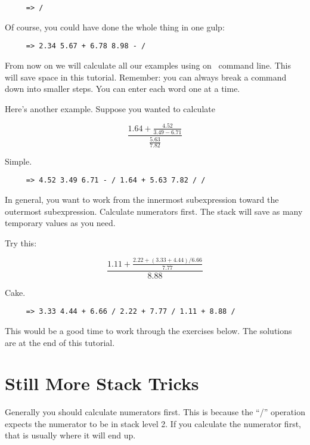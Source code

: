 \documentclass{report}
\begin{document}
\begin{verbatim}
     => /
\end{verbatim}

Of course, you could have done the whole thing in one gulp:

\begin{verbatim}
     => 2.34 5.67 + 6.78 8.98 - /
\end{verbatim}

From now on we will calculate all our examples using on \CLAC\ command line. This will save
space in this tutorial. Remember: you can always break a command down into smaller steps. You
can enter each word one at a time.

Here's another example. Suppose you wanted to calculate

\begin{displaymath}
     \frac { 1.64 + \frac {4.52}{3.49 - 6.71} }{ \frac {5.63}{7.82} }
\end{displaymath}

Simple.

\begin{verbatim}
     => 4.52 3.49 6.71 - / 1.64 + 5.63 7.82 / /
\end{verbatim}

In general, you want to work from the innermost subexpression toward the outermost
subexpression. Calculate numerators first. The stack will save as many temporary values as you
need.

Try this:

\begin{displaymath}
     \frac{1.11 + \frac{2.22 + (3.33 + 4.44)/6.66 }{7.77} }{8.88}
\end{displaymath}

Cake.

\begin{verbatim}
     => 3.33 4.44 + 6.66 / 2.22 + 7.77 / 1.11 + 8.88 /
\end{verbatim}

This would be a good time to work through the exercises below. The solutions are at the end of
this tutorial.

\section{Still More Stack Tricks}

Generally you should calculate numerators first. This is because the ``/'' operation expects the
numerator to be in stack level 2. If you calculate the numerator first, that is usually where it
will end up.
\end{document}
